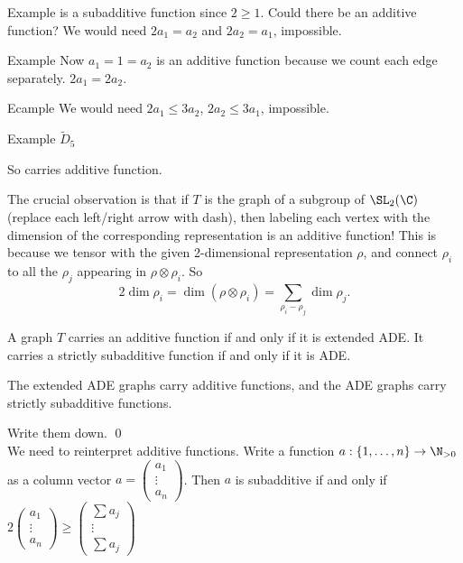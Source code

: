 Example
is a subadditive function since $2 \geq 1$. Could there be an additive function? We would need $2a_1=a_2$ and $2a_2=a_1$, impossible. 



Example
Now $a_1=1=a_2$ is an additive function because we count each edge separately. $2a_1=2a_2$.

Ecample
We would need $2a_1 \leq 3a_2$, $2a_2 \leq 3a_1$, impossible. 



Example 
$\tilde{D}_5$

So carries additive function.


The crucial observation is that if $T$ is the \mc graph of a subgroup of $\SL_2(\C)$ (replace each left/right arrow with dash), then labeling each vertex with the dimension of the corresponding representation is an additive function! This is because we tensor with the given 2-dimensional representation $\rho$, and connect $\rho_i$ to all the $\rho_j$ appearing in $\rho \otimes \rho_i$. So
	\[
	2\dim \rho_i = \dim(\rho \otimes \rho_i) = \sum_{\rho_i - \rho_j} \dim \rho_j.
	\]


\begin{thm}
A graph $T$ carries an additive function if and only if it is extended ADE. It carries a strictly subadditive function if and only if it is ADE. 
\end{thm}





\begin{lem} \label{lem:b}
The extended ADE graphs carry additive functions, and the ADE graphs carry strictly subadditive functions. 
\end{lem}

\pf Write them down. \qed \\


We need to reinterpret additive functions. Write a function $a: \{1,\ldots,n\} \to \N_{>0}$ as a column vector $a= \begin{pmatrix} a_1 \\ \vdots \\ a_n \end{pmatrix}$. Then $a$ is subadditive if and only if $2 \begin{pmatrix} a_1 \\ \vdots \\ a_n \end{pmatrix} \geq \begin{pmatrix} \sum a_j \\ \vdots \\ \sum a_j \end{pmatrix}$ %

